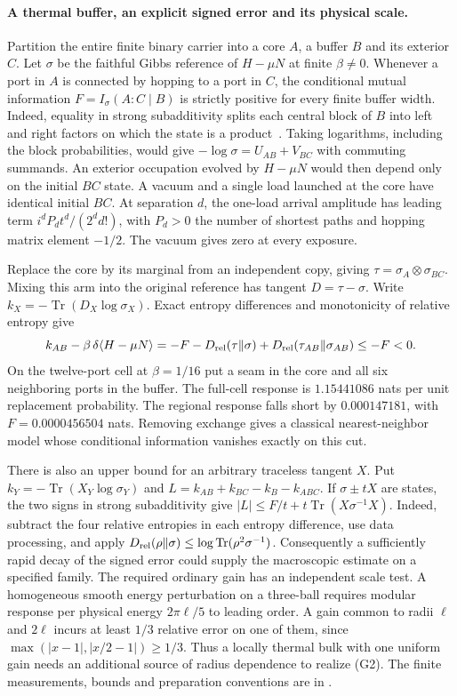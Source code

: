 \documentclass[11pt]{article}
\begin{document}
\paragraph{A thermal buffer, an explicit signed error and its physical scale.}\label{par:thermal-transport-screen}
Partition the entire finite binary carrier into a core $A$, a buffer $B$ and
its exterior $C$. Let $\sigma$ be the faithful Gibbs reference of $H-\mu N$
at finite $\beta\ne0$. Whenever a port in $A$ is connected by hopping to a
port in $C$, the conditional mutual information $F=I_\sigma(A:C\mid B)$
is strictly positive for every finite buffer width. Indeed, equality in
strong subadditivity splits each central block of $B$ into left and right
factors on which the state is a product~\cite{hjpw}. Taking logarithms,
including the block probabilities, would give
$-\log\sigma=U_{AB}+V_{BC}$ with commuting summands. An exterior
occupation evolved by $H-\mu N$ would then depend only on the initial
$BC$ state. A vacuum and a single load launched at the core have
identical initial $BC$. At separation $d$, the one-load arrival
amplitude has leading term $i^d P_d t^d/(2^d d!)$, with $P_d>0$ the
number of shortest paths and hopping matrix element $-1/2$.
The vacuum gives zero at every exposure.

Replace the core by its marginal from an independent copy, giving
$\tau=\sigma_A\otimes\sigma_{BC}$. Mixing this arm into the original
reference has tangent $D=\tau-\sigma$. Write
$k_X=-\operatorname{Tr}(D_X\log\sigma_X)$. Exact entropy differences
and monotonicity of relative entropy give
\[
 k_{AB}-\beta\,\delta\langle H-\mu N\rangle =
 -F-D_{\rm rel}(\tau\Vert\sigma)
     +D_{\rm rel}(\tau_{AB}\Vert\sigma_{AB})\le -F<0 .
\]
On the twelve-port cell at $\beta=1/16$ put a seam in the core and
all six neighboring ports in the buffer. The full-cell response is
$1.15441086$ nats per unit replacement probability. The regional
response falls short by $0.000147181$, with $F=0.0000456504$ nats.
Removing exchange gives a classical nearest-neighbor model whose
conditional information vanishes exactly on this cut.

There is also an upper bound for an arbitrary traceless tangent $X$.
Put $k_Y=-\operatorname{Tr}(X_Y\log\sigma_Y)$ and
$L=k_{AB}+k_{BC}-k_B-k_{ABC}$. If $\sigma\pm tX$ are states, the
two signs in strong subadditivity give
$|L|\le F/t+t\operatorname{Tr}(X\sigma^{-1}X)$.
Indeed, subtract the four relative entropies in each entropy difference,
use data processing, and apply
$D_{\rm rel}(\rho\Vert\sigma)\le\log\operatorname{Tr}(\rho^2\sigma^{-1})$.
Consequently a sufficiently rapid decay of the signed error could
supply the macroscopic estimate on a specified family. The required
ordinary gain has an independent scale test. A homogeneous smooth
energy perturbation on a three-ball requires modular response per
physical energy $2\pi\ell/5$ to leading order. A gain common to radii
$\ell$ and $2\ell$ incurs at least $1/3$ relative error on one of
them, since $\max(|x-1|,|x/2-1|)\ge1/3$. Thus a locally thermal
bulk with one uniform gain needs an additional source of radius
dependence to realize (G2). The finite measurements, bounds and
preparation conventions are in
.
\end{document}
